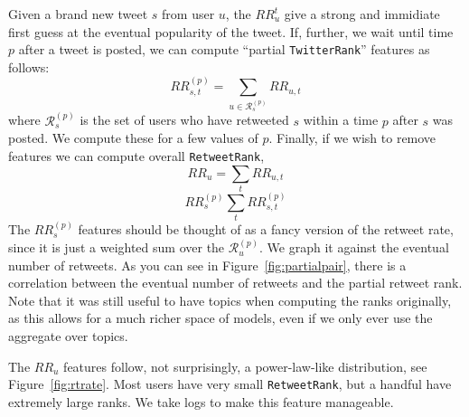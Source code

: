 Given a brand new tweet $s$ from user $u$, the $RR_u^t$ give a strong and immidiate first guess at the eventual popularity of the tweet.  If, further, we wait until time $p$ after a tweet is posted, we can compute ``partial \texttt{TwitterRank}'' features as follows:
\[RR_{s,t}^{(p)} = \sum_{u\in\mathcal{R}_s^{(p)}}RR_{u,t}\]
where $\mathcal{R}_s^{(p)}$ is the set of users who have retweeted $s$ within a time $p$ after $s$ was posted.  
We compute these for a few values of $p$.
Finally, if we wish to remove features we can compute overall \texttt{RetweetRank},
\[RR_{u} =\sum_t RR_{u,t}\]
\[RR_{s}^{(p)} \sum_t RR_{s,t}^{(p)}\]
The $RR_s^{(p)}$ features should be thought of as a fancy version of the retweet rate, since it is just a weighted sum over the $\mathcal{R}_u^{(p)}$.  We graph it against the eventual number of retweets.  As you can see in Figure~\ref{fig:partialpair}, there is a correlation between the eventual number of retweets and the partial retweet rank.  
Note that it was still useful to have topics when computing the ranks originally, as this allows for a much richer space of models, even if we only ever use the aggregate over topics.    



The $RR_{u}$ features follow, not surprisingly, a power-law-like distribution, see Figure~\ref{fig:rtrate}.  
Most users have very small \texttt{RetweetRank}, but a handful have extremely large ranks.  
We take logs to make this feature manageable.  

\label{sec:rtrfeatues}
